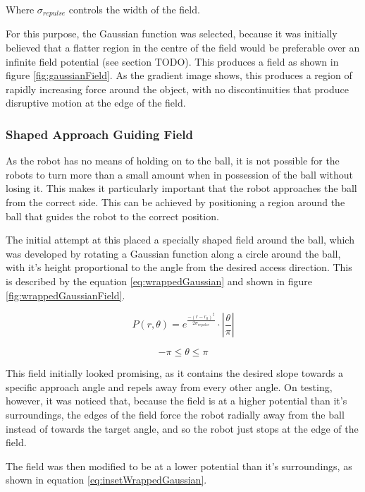 \documentclass[10pt,british,english]{article}
\begin{document}
Where $\sigma_{repulse}$ controls the width of the field.

For this purpose, the Gaussian function was selected, because it was initially believed that a flatter region in the centre of the field would be preferable over an infinite field potential (see section TODO). This produces a field as shown in figure \ref{fig:gaussianField}. As the gradient image shows, this produces a region of rapidly increasing force around the object, with no discontinuities that produce disruptive motion at the edge of the field.

\subsubsection{Shaped Approach Guiding Field\label{sub:Shaped-Approach-Guiding}}

As the robot has no means of holding on to the ball, it is not possible for the robots to turn more than a small amount when in possession of the ball without losing it. This makes it particularly important that the robot approaches the ball from the correct side. This can be achieved by positioning a region around the ball that guides the robot to the correct position.

The initial attempt at this placed a specially shaped field around the ball, which was developed by rotating a Gaussian function along a circle around the ball, with it's height proportional to the angle from the desired access direction. This is described by the equation \ref{eq:wrappedGaussian} and shown in figure \ref{fig:wrappedGaussianField}.

\begin{equation}
P\left(r,\theta\right)=e^{\frac{-\left(r-r_{0}\right)^{2}}{2\sigma_{repulse}}}\cdot\left|\frac{\theta}{\pi}\right|\label{eq:wrappedGaussian}
\end{equation}

\[
-\pi\leq\theta\leq\pi
\]

This field initially looked promising, as it contains the desired slope towards a specific approach angle and repels away from every other angle. On testing, however, it was noticed that, because the
field is at a higher potential than it's surroundings, the edges of the field force the robot radially away from the ball instead of towards the target angle, and so the robot just stops at the edge of the field.

The field was then modified to be at a lower potential than it's surroundings, as shown in equation \ref{eq:insetWrappedGaussian}.
\end{document}
